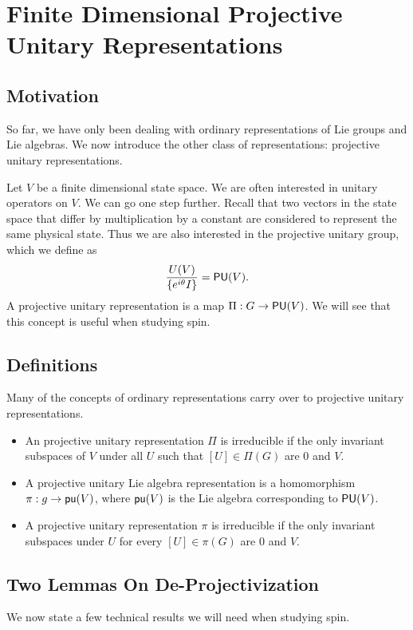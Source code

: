 \section{Finite Dimensional Projective Unitary Representations}
\subsection{Motivation}
So far, we have only been dealing with ordinary representations of Lie groups and Lie algebras. We now introduce the other class of representations: projective unitary representations.

Let $V$ be a finite dimensional state space. We are often interested in unitary operators on $V$. We can go one step further. Recall that two vectors in the state space that differ by multiplication by a constant are considered to represent the same physical state. Thus we are also interested in the projective unitary group, which we define as
\[
    \frac{U(V)}{\{e^{i\theta}I\}} = \operatorname{\textsf{PU}}(V).
\]
A projective unitary representation is a map $\Pi: G \rightarrow \operatorname{\textsf{PU}}(V)$. We will see that this concept is useful when studying spin.

\subsection{Definitions}
Many of the concepts of ordinary representations carry over to projective unitary representations.
\begin{itemize}
    \item An projective unitary representation $\Pi$ is irreducible if the only invariant subspaces of $V$ under all $U$ such that $[U] \in \Pi(G)$ are $0$ and $V$.
    \item A projective unitary Lie algebra representation is a homomorphism $\mathfrak\pi: g \rightarrow \operatorname{\textsf{pu}}(V)$, where $\operatorname{\textsf{pu}}(V)$ is the Lie algebra corresponding to $\operatorname{\textsf{PU}}(V)$.
    \item A projective unitary representation $\pi$ is irreducible if the only invariant subspaces under $U$ for every $[U] \in \pi(G)$ are $0$ and $V$.
\end{itemize}

\subsection{Two Lemmas On De-Projectivization}
We now state a few technical results we will need when studying spin.

